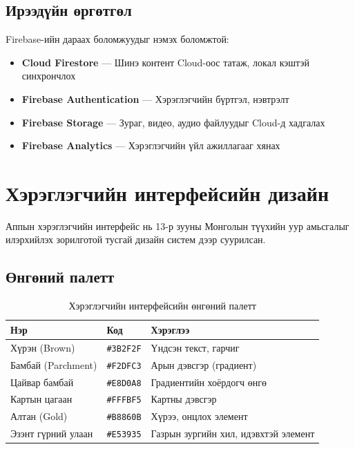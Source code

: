 \subsection{Ирээдүйн өргөтгөл}

Firebase-ийн дараах боломжуудыг нэмэх боломжтой:
\begin{itemize}
	\item \textbf{Cloud Firestore} — Шинэ контент Cloud-оос татаж, локал кэштэй синхрончлох
	\item \textbf{Firebase Authentication} — Хэрэглэгчийн бүртгэл, нэвтрэлт
	\item \textbf{Firebase Storage} — Зураг, видео, аудио файлуудыг Cloud-д хадгалах
	\item \textbf{Firebase Analytics} — Хэрэглэгчийн үйл ажиллагааг хянах
\end{itemize}

\section{Хэрэглэгчийн интерфейсийн дизайн}

Аппын хэрэглэгчийн интерфейс нь 13-р зууны Монголын түүхийн уур амьсгалыг илэрхийлэх зорилготой тусгай дизайн систем дээр суурилсан.

\subsection{Өнгөний палетт}

\begin{table}[htbp]
\centering
\begin{tabular}{|p{3cm}|p{3cm}|p{7.5cm}|}
\hline
\textbf{Нэр} & \textbf{Код} & \textbf{Хэрэглээ} \\
\hline
Хүрэн (Brown) & \texttt{\#3B2F2F} & Үндсэн текст, гарчиг \\
\hline
Бамбай (Parchment) & \texttt{\#F2DFC3} & Арын дэвсгэр (градиент) \\
\hline
Цайвар бамбай & \texttt{\#E8D0A8} & Градиентийн хоёрдогч өнгө \\
\hline
Картын цагаан & \texttt{\#FFFBF5} & Картны дэвсгэр \\
\hline
Алтан (Gold) & \texttt{\#B8860B} & Хүрээ, онцлох элемент \\
\hline
Эзэнт гүрний улаан & \texttt{\#E53935} & Газрын зургийн хил, идэвхтэй элемент \\
\hline
\end{tabular}
\caption{Хэрэглэгчийн интерфейсийн өнгөний палетт}
\label{tab:color_palette}
\end{table}

